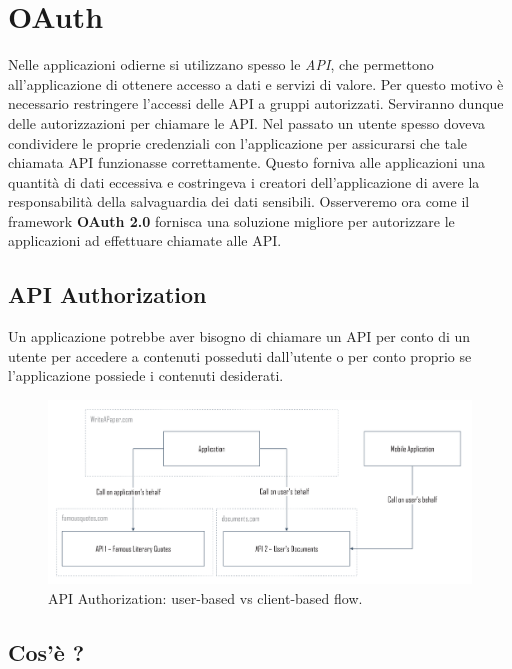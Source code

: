 \chapter{OAuth}

Nelle applicazioni odierne si utilizzano spesso le \textit{API}, che permettono
all'applicazione di ottenere accesso a dati e servizi di valore. Per questo motivo
è necessario restringere l'accessi delle API a gruppi autorizzati. Serviranno dunque
delle autorizzazioni per chiamare le API. Nel passato un utente spesso doveva condividere
le proprie credenziali con l'applicazione per assicurarsi che tale chiamata API
funzionasse correttamente. Questo forniva alle applicazioni una quantità di dati
eccessiva e costringeva i creatori dell'applicazione di avere la responsabilità
della salvaguardia dei dati sensibili. Osserveremo ora come il framework
\textbf{OAuth 2.0} fornisca una soluzione migliore per autorizzare le applicazioni
ad effettuare chiamate alle API.

\section{API Authorization}

Un applicazione potrebbe aver bisogno di chiamare un API per conto di un utente
per accedere a contenuti posseduti dall'utente o per conto proprio se l'applicazione
possiede i contenuti desiderati.

\begin{figure}[H]
    \centering
    \includegraphics[width=\textwidth, keepaspectratio]{capitoli/id_managing/imgs/api1.png}
    \caption{API Authorization: user-based vs client-based flow.}
\end{figure}

\section{Cos'è ?}

